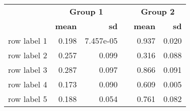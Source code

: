 \begin{tabular}{lrrcrr} 
\toprule 
  	 & 	 \multicolumn{2}{c}{\textbf{Group 1}} 	 & 	 \textbf{ } 	 & 	 \multicolumn{2}{c}{\textbf{Group 2}} \\ 
\cmidrule(r){2-3} 	 \cmidrule(r){5-6} 	  
  	 & 	 \textbf{mean} 	 & 	 \textbf{sd} 	 & 	 \textbf{ } 	 & 	 \textbf{mean} 	 & 	 \textbf{sd} \\ 
\midrule 
row label 1 	 & 	 0.198 	 & 	 7.457e-05 	 & 	   	 & 	 0.937 	 & 	 0.020 \\ 
row label 2 	 & 	 0.257 	 & 	 0.099 	 & 	   	 & 	 0.316 	 & 	 0.088 \\ 
row label 3 	 & 	 0.287 	 & 	 0.097 	 & 	   	 & 	 0.866 	 & 	 0.091 \\ 
row label 4 	 & 	 0.173 	 & 	 0.090 	 & 	   	 & 	 0.609 	 & 	 0.005 \\ 
row label 5 	 & 	 0.188 	 & 	 0.054 	 & 	   	 & 	 0.761 	 & 	 0.082 \\ 
\bottomrule 
\end{tabular}